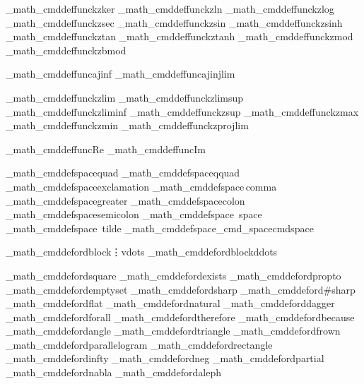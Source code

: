 {\brl@document_math_cmddef{funckz}{\ker}{ker}
\brl@document_math_cmddef{funckz}{\ln}{ln}
\brl@document_math_cmddef{funckz}{\log}{log}
\brl@document_math_cmddef{funckz}{\sec}{sec}
\brl@document_math_cmddef{funckz}{\sin}{sin}
\brl@document_math_cmddef{funckz}{\sinh}{sinh}
\brl@document_math_cmddef{funckz}{\tan}{tan}
\brl@document_math_cmddef{funckz}{\tanh}{tanh}
\brl@document_math_cmddef{funckz}{\mod}{mod}
\brl@document_math_cmddef{funckz}{\bmod}{bmod}

\brl@document_math_cmddef{funcaj}{\inf}{inf}
\brl@document_math_cmddef{funcaj}{\injlim}{injlim}

\brl@document_math_cmddef{funckz}{\lim}{lim}
\brl@document_math_cmddef{funckz}{\limsup}{limsup}
\brl@document_math_cmddef{funckz}{\liminf}{liminf}
\brl@document_math_cmddef{funckz}{\sup}{sup}
\brl@document_math_cmddef{funckz}{\max}{max}
\brl@document_math_cmddef{funckz}{\min}{min}
\brl@document_math_cmddef{funckz}{\projlim}{projlim}

\brl@document_math_cmddef{func}{\Re}{Re}
\brl@document_math_cmddef{func}{\Im}{Im}

\brl@document_math_cmddef{space}{\quad}{quad}
\brl@document_math_cmddef{space}{\qquad}{qquad}
\brl@document_math_cmddef{space}{\!}{exclamation}
\brl@document_math_cmddef{space}{\,}{comma}
\brl@document_math_cmddef{space}{\>}{greater}
\brl@document_math_cmddef{space}{\:}{colon}
\brl@document_math_cmddef{space}{\;}{semicolon}
\brl@document_math_cmddef{space}{\ }{space}
\brl@document_math_cmddef{space}{~}{tilde}
\brl@document_math_cmddef{space}{\brl@math_cmd_space}{cmdspace}


\brl@document_math_cmddef{ordblock}{\vdots}{vdots}
\brl@document_math_cmddef{ordblock}{\ddots}{ddots}

\brl@document_math_cmddef{ord}{\square}{square}
\brl@document_math_cmddef{ord}{\exists}{exists}
\brl@document_math_cmddef{ord}{\propto}{propto}
\brl@document_math_cmddef{ord}{\emptyset}{emptyset}
\brl@document_math_cmddef{ord}{\sharp}{sharp}
\brl@document_math_cmddef{ord}{\#}{sharp}
\brl@document_math_cmddef{ord}{\flat}{flat}
\brl@document_math_cmddef{ord}{\natural}{natural}
\brl@document_math_cmddef{ord}{\dagger}{dagger}
\brl@document_math_cmddef{ord}{\forall}{forall}
\brl@document_math_cmddef{ord}{\therefore}{therefore}
\brl@document_math_cmddef{ord}{\because}{because}
\brl@document_math_cmddef{ord}{\angle}{angle}
\brl@document_math_cmddef{ord}{\triangle}{triangle}
\brl@document_math_cmddef{ord}{\frown}{frown}
\brl@document_math_cmddef{ord}{\parallelogram}{parallelogram}
\brl@document_math_cmddef{ord}{\rectangle}{rectangle}
\brl@document_math_cmddef{ord}{\infty}{infty}
\brl@document_math_cmddef{ord}{\neg}{neg}
\brl@document_math_cmddef{ord}{\partial}{partial}
\brl@document_math_cmddef{ord}{\nabla}{nabla}
\brl@document_math_cmddef{ord}{\aleph}{aleph}

}
